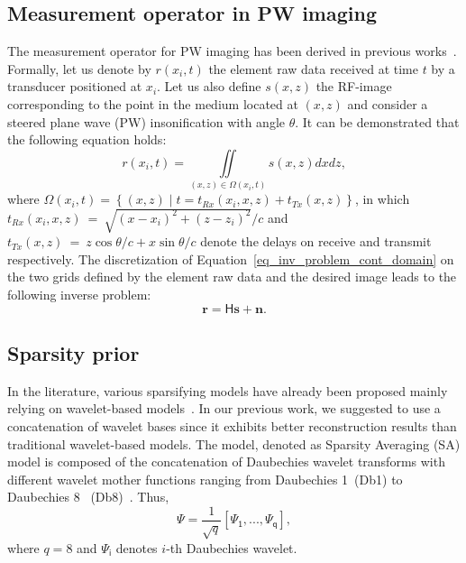 \documentclass[conference]{IEEEtran}
\begin{document}
\subsection{Measurement operator in PW imaging}
\label{subsec:measop_PWimaging} 
The measurement operator for PW imaging has been derived in previous works~\cite{Besson_ICIP_2016, Besson_EUSIPCO_2016}. Formally, let us denote by $r \left(x_i, t\right)$ the element raw data received at time $t$ by a transducer positioned at $x_i$. Let us also define $s \left(x, z\right)$ the RF-image corresponding to the point in the medium located at $\left(x, z\right)$ and consider a steered plane wave (PW) insonification with angle $\theta$. It can be demonstrated that the following equation holds:
\begin{equation}
\label{eq_inv_problem_cont_domain}
r \left( x_i, t \right) = \iint \limits_{ \left( x, z \right) \in \Omega \left( x_i, t \right)} s \left( x, z \right) dx dz, 
\end{equation} 
where $\Omega \left(x_i, t \right) = \left\lbrace \left( x, z\right) \; | \; t = t_{Rx} \left( x_i, x, z \right) + t_{Tx} \left( x, z \right) \right\rbrace$, in which $t_{Rx} \left( x_i, x, z \right)~=~\sqrt{\left( x - x_i\right)^2 + \left( z - z_i \right)^2} / c$ and $t_{Tx}\left(x, z \right)~=~z \cos \theta / c + x \sin \theta / c$ denote the delays on receive and transmit respectively.
The discretization of Equation~\eqref{eq_inv_problem_cont_domain} on the two grids defined by the element raw data and the desired image leads to the following inverse problem:
\begin{equation}
\bm{r} = \mathsf{H} \bm{s} + \bm{n}.
\end{equation}
\subsection{Sparsity prior}
\label{subsec:sparsity_prior}
\par In the literature, various sparsifying models have already been proposed mainly relying on wavelet-based models~\cite{Schiffner_IUS_2012, David_JASA_2015, Chen2015}. In our previous work, we suggested to use a concatenation of wavelet bases since it exhibits better reconstruction results than traditional wavelet-based models. The model, denoted as Sparsity Averaging (SA) model is composed of the concatenation of Daubechies wavelet transforms with different wavelet mother functions ranging from Daubechies 1~(Db1) to Daubechies 8 ~(Db8)~\cite{Carrillo_SPL_2012, Carrillo_IUS_2015, Besson_ICIP_2016, Besson_EUSIPCO_2016}. Thus,
\begin{equation}\label{sara}
\mathsf{\Psi} = \frac{1}{\sqrt{q}} [\mathsf{\Psi_{1}},...,\mathsf{\Psi_{q}}],
\end{equation}
where $q=8$ and $\mathsf{\Psi_i}$ denotes $i$-th Daubechies wavelet. 
\end{document}
